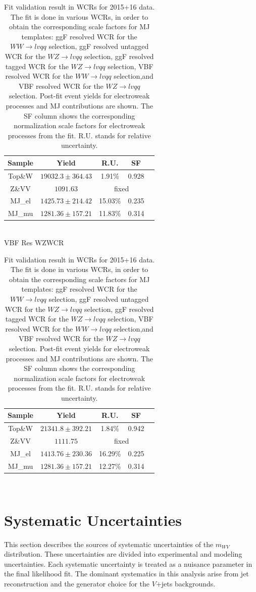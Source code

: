 \begin{table}[ht]
\begin{tabular}{|c|c|c|c|c|}
      \hline
     Sample    & Yield   & R.U.    & SF    \\ \hline
     Top\&W    & $19032.3\pm 364.43$  & 1.91\%  & 0.928  \\ \hline
     Z\&VV     & $1091.63$ & \multicolumn{2}{c|}{fixed} \\ \hline
     MJ\_el    & $1425.73\pm 214.42$  & 15.03\%  &0.235   \\ \hline
     MJ\_mu    & $1281.36\pm 157.21$  & 11.83\%  &0.314   \\ \hline
     \end{tabular}\hfill%
     \\
     \large{VBF Res WZWCR\\ }
     \begin{tabular}{|c|c|c|c|c|}
      \hline
     Sample    & Yield   & R.U.    & SF    \\ \hline
     Top\&W    & $21341.8\pm 392.21$  & 1.84\%  & 0.942  \\ \hline
     Z\&VV     & $1111.75$ & \multicolumn{2}{c|}{fixed} \\ \hline
     MJ\_el    & $1413.76\pm 230.36$  & 16.29\%  &0.225   \\ \hline
     MJ\_mu    & $1281.36\pm 157.21$  & 12.27\%  &0.314   \\ \hline
     \end{tabular}\hfill%
     \\
\caption{\label{tab:template_validation_CR} Fit validation result in WCRs for 2015+16 data. 
The fit is done in various WCRs, in order to obtain the corresponding scale factors for MJ templates: ggF resolved WCR for the $WW\to lvqq$ selection, ggF resolved untagged WCR for the $WZ\to lvqq$ selection,  ggF resolved tagged WCR for the $WZ\to lvqq$ selection,  VBF resolved WCR for the $WW\to lvqq$ selection,and VBF resolved WCR for the $WZ\to lvqq$ selection. Post-fit event yields for electroweak processes and MJ contributions are shown. The SF column shows the corresponding normalization scale factors for electroweak processes from the fit.
R.U. stands for relative uncertainty.
}
\end{table}



\chapter{Systematic Uncertainties}
This section describes the sources of systematic uncertainties of the $m_{WV}$ distribution. These uncertainties are divided into experimental and modeling uncertainties. Each systematic uncertainty is treated as a nuisance parameter in the final likelihood fit. The dominant systematics in this analysis arise from jet reconstruction and the generator choice for the $V$+jets backgrounds.

